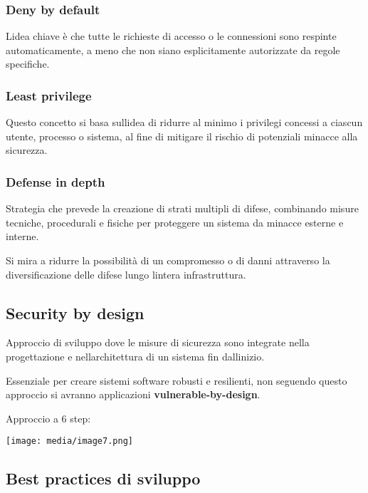 \subsubsection{Deny by default}\label{deny-by-default-1}

L\textquotesingle idea chiave è che tutte le richieste di accesso o le
connessioni sono respinte automaticamente, a meno che non siano
esplicitamente autorizzate da regole specifiche.

\subsubsection{Least privilege}\label{least-privilege}

Questo concetto si basa sull\textquotesingle idea di ridurre al minimo i
privilegi concessi a ciascun utente, processo o sistema, al fine di
mitigare il rischio di potenziali minacce alla sicurezza.

\subsubsection{Defense in depth}\label{defense-in-depth-1}

Strategia che prevede la creazione di strati multipli di difese,
combinando misure tecniche, procedurali e fisiche per proteggere un
sistema da minacce esterne e interne.

Si mira a ridurre la possibilità di un compromesso o di danni attraverso
la diversificazione delle difese lungo l\textquotesingle intera
infrastruttura.

\subsection{Security by design}\label{security-by-design}

Approccio di sviluppo dove le misure di sicurezza sono integrate nella
progettazione e nell\textquotesingle architettura di un sistema fin
dall\textquotesingle inizio.

Essenziale per creare sistemi software robusti e resilienti, non
seguendo questo approccio si avranno applicazioni
\textbf{vulnerable-by-design}.

Approccio a 6 step:

\texttt{[image: media/image7.png]}

\subsection{Best practices di
sviluppo}\label{best-practices-di-sviluppo}

